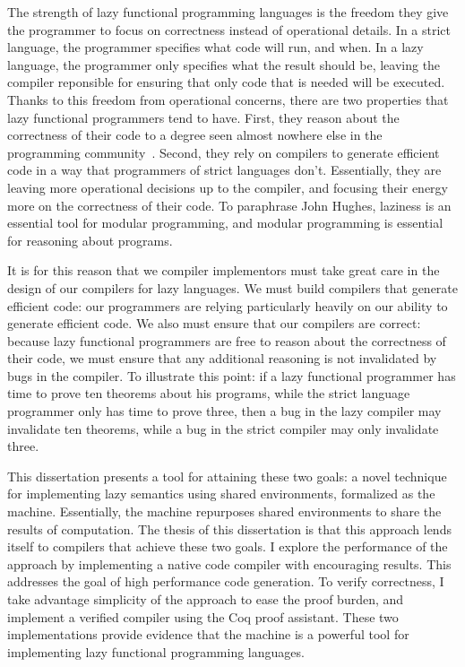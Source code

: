The strength of lazy functional programming languages is the freedom they give
the programmer to focus on correctness instead of operational details. In a
strict language, the programmer specifies what code will run, and when. In a
lazy language, the programmer only specifies what the result should be, leaving
the compiler reponsible for ensuring that only code that is needed will be
executed. Thanks to this freedom from operational concerns, there are two
properties that lazy functional programmers tend to have. First, they reason
about the correctness of their code to a degree seen almost nowhere else in the
programming community~\cite{hughes1989functional, spector2018total}.  Second,
they rely on compilers to generate efficient code in a way that programmers of
strict languages don't. Essentially, they are leaving more operational decisions
up to the compiler, and focusing their energy more on the correctness of their
code. To paraphrase John Hughes, laziness is an essential tool for modular
programming, and modular programming is essential for reasoning about programs. 

It is for this reason that we compiler implementors must take great care in the
design of our compilers for lazy languages. We must build compilers that
generate efficient code: our programmers are relying particularly heavily on
our ability to generate efficient code. We also must ensure that our compilers
are correct: because lazy functional programmers are free to reason about the
correctness of their code, we must ensure that any additional reasoning is not
invalidated by bugs in the compiler. To illustrate this point: if a lazy
functional programmer has time to prove ten theorems about his programs, while
the strict language programmer only has time to prove three, then a bug in the
lazy compiler may invalidate ten theorems, while a bug in the strict compiler
may only invalidate three.

This dissertation presents a tool for attaining these two goals: a novel
technique for implementing lazy semantics using shared environments, formalized
as the \ce machine. Essentially, the \ce machine repurposes shared environments
to share the results of computation. The thesis of this dissertation is that
this approach lends itself to compilers that achieve these two goals. I explore
the performance of the approach by implementing a native code compiler with
encouraging results. This addresses the goal of high performance code
generation. To verify correctness, I take advantage simplicity of the approach
to ease the proof burden, and implement a verified compiler using the Coq proof
assistant. These two implementations provide evidence that the \ce machine is a
powerful tool for implementing lazy functional programming languages.

